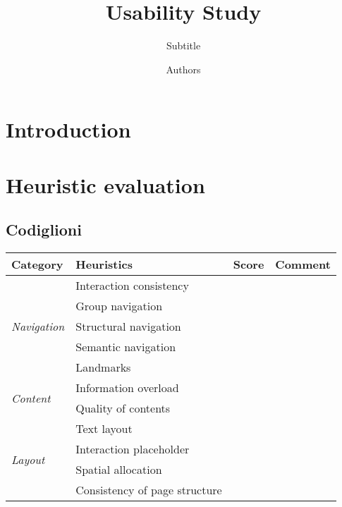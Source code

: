 \documentclass[a4paper, 11pt, parskip=half]{scrreprt}
\title{Usability Study}
\subtitle{Subtitle}
\author{Authors}
\begin{document}
\maketitle
\tableofcontents
\newpage
{}


\chapter{Introduction}


\chapter{Heuristic evaluation}

\section{Codiglioni}

\begin{center}
    \def\arraystretch{1.3}
    \begin{tabular}{|l|l|l|m{7cm}|}
        \hline
        \textbf{Category} & \textbf{Heuristics} & \textbf{Score} & \textbf{Comment} \\ \hline
        \multirow{5}{*}{\textit{Navigation}} & Interaction consistency & & \\ \cline{2-4}
        & Group navigation & & \\ \cline{2-4}
        & Structural navigation & & \\ \cline{2-4}
        & Semantic navigation & & \\ \cline{2-4}
        & Landmarks & & \\ \hline
        \multirow{2}{*}{\textit{Content}} & Information overload &  & \\ \cline{2-4}
        & Quality of contents &  & 							\\ \hline
        \multirow{4}{*}{\textit{Layout}} & Text layout & & \\ \cline{2-4}
        & Interaction placeholder & & \\ \cline{2-4}
        & Spatial allocation & & \\ \cline{2-4}
        & Consistency of page structure & & \\ \hline
    \end{tabular}
\end{center}
\end{document}
